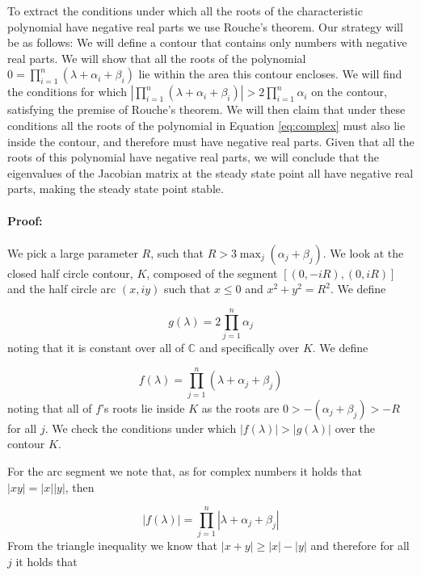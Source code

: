  To extract the conditions under which all the roots of the characteristic polynomial have negative real parts we use Rouche's theorem.
  Our strategy will be as follows:
  We will define a contour that contains only numbers with negative real parts.
  We will show that all the roots of the polynomial $0=\prod_{i=1}^n(\lambda+\alpha_i+\beta_i)$ lie within the area this contour encloses.
  We will find the conditions for which  $|\prod_{i=1}^n(\lambda+\alpha_i+\beta_i)|>2\prod_{i=1}^n\alpha_i$ on the contour, satisfying the premise of Rouche's theorem.
  We will then claim that under these conditions all the roots of the polynomial in Equation \ref{eq:complex} must also lie inside the contour, and therefore must have negative real parts.
  Given that all the roots of this polynomial have negative real parts, we will conclude that the eigenvalues of the Jacobian matrix at the steady state point all have negative real parts, making the steady state point stable.

  \paragraph{Proof:} We pick a large parameter $R$, such that $R>3\max_j(\alpha_j+\beta_j)$.
  We look at the closed half circle contour, $K$, composed of the segment $[(0,-iR),(0,iR)]$ and the half circle arc $(x,iy)$ such that $x\leq 0$ and $x^2+y^2=R^2$.
  We define 

  \begin{equation*}
      g(\lambda)=2\prod_{j=1}^n\alpha_j
  \end{equation*}
  noting that it is constant over all of $\mathbb{C}$ and specifically over $K$.
  We define

  \begin{equation*}
      f(\lambda)=\prod_{j=1}^n(\lambda+\alpha_j+\beta_j)
  \end{equation*}
  noting that all of $f$'s roots lie inside $K$ as the roots are $0>-(\alpha_j+\beta_j)>-R$ for all $j$.
  We check the conditions under which $|f(\lambda)|>|g(\lambda)|$ over the contour $K$.

  For the arc segment we note that, as for complex numbers it holds that $|xy|=|x||y|$, then

  \begin{equation*}
      |f(\lambda)|=\prod_{j=1}^n|\lambda+\alpha_j+\beta_j|
  \end{equation*}
  From the triangle inequality we know that $|x+y| \geq |x|-|y|$ and therefore for all $j$ it holds that

